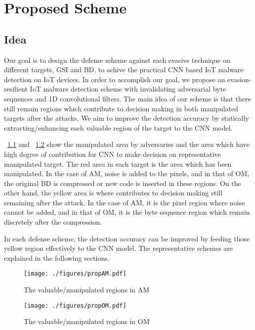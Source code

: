 \chapter{Proposed Scheme}\label{sec:proposed_scheme}

\section{Idea}
Our goal is to design the defense scheme against each evasive technique on different targets, GSI and BD, to achive the practical CNN based IoT malware detection on IoT devices.
In order to accomplish our goal, we propose an evasion-resilient IoT malware detection scheme with invalidating adversarial byte sequences and 1D convolutional filters.  
The main idea of our scheme is that there still remain regions which contribute to decision making in both manipulated targets after the attacks.
We aim to improve the detection accuracy by statically extracting/enhancing each valuable region of the target to the CNN model.

\figurename~\ref{fig:propAM} and \figurename~\ref{fig:propOM} show the manipulated area by adversaries and the area which have high degree of contribution for CNN to make decision on representative manipulated target.
The red area in each target is the area which has been manipulated.
In the case of AM, noise is added to the pixels, and in that of OM, the original BD is compressed or new code is inserted in these regions.
On the other hand, the yellow area is where contributes to decision making still remaining after the attack.
In the case of AM, it is the pixel region where noise cannot be added, and in that of OM, it is the byte sequence region which remain discretely after the compression.

In each defense scheme, the detection accuracy can be improved by feeding those yellow region effectively to the CNN model.
The representative schemes are explained in the following sections.

\begin{figure}[p]
 \centering
 \hspace{-55pt}
 \texttt{[image: ./figures/propAM.pdf]}
 \caption{The valuable/manipulated regions in AM} 
 \label{fig:propAM}
\end{figure}
\begin{figure}[p]
 \centering
 \hspace{-100pt}
 \texttt{[image: ./figures/propOM.pdf]}
 \caption{The valuable/manipulated regions in OM} 
 \label{fig:propOM}
\end{figure}
\afterpage{\clearpage}
\newpage

